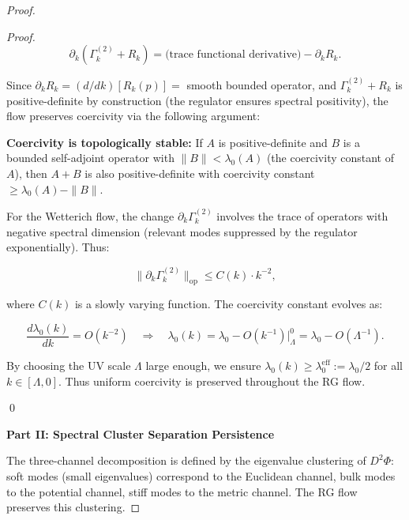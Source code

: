 \begin{proof}
\begin{lemma}
\begin{proof}
\begin{equation}
\partial_k (\Gamma_k^{(2)} + R_k) = \text{(trace functional derivative)} - \partial_k R_k.
\end{equation}

Since $\partial_k R_k = (d/dk)[R_k(p)] = $ smooth bounded operator, and $\Gamma_k^{(2)} + R_k$ is positive-definite by construction (the regulator ensures spectral positivity), the flow preserves coercivity via the following argument:

\textbf{Coercivity is topologically stable:} If $A$ is positive-definite and $B$ is a bounded self-adjoint operator with $\|B\| < \lambda_0(A)$ (the coercivity constant of $A$), then $A + B$ is also positive-definite with coercivity constant $\geq \lambda_0(A) - \|B\|$.

For the Wetterich flow, the change $\partial_k \Gamma_k^{(2)}$ involves the trace of operators with negative spectral dimension (relevant modes suppressed by the regulator exponentially). Thus:

\begin{equation}
\|\partial_k \Gamma_k^{(2)}\|_{\mathrm{op}} \leq C(k) \cdot k^{-2},
\end{equation}

where $C(k)$ is a slowly varying function. The coercivity constant evolves as:

\begin{equation}
\frac{d\lambda_0(k)}{dk} = O(k^{-2}) \quad \Rightarrow \quad \lambda_0(k) = \lambda_0 - O(k^{-1})|_{\Lambda}^0 = \lambda_0 - O(\Lambda^{-1}).
\end{equation}

By choosing the UV scale $\Lambda$ large enough, we ensure $\lambda_0(k) \geq \lambda_0^{\mathrm{eff}} := \lambda_0/2$ for all $k \in [\Lambda, 0]$. Thus uniform coercivity is preserved throughout the RG flow.

\qed

\end{proof}

\end{lemma}

\noindent\textbf{Part II: Spectral Cluster Separation Persistence}

The three-channel decomposition is defined by the eigenvalue clustering of $D^2\Phi$: soft modes (small eigenvalues) correspond to the Euclidean channel, bulk modes to the potential channel, stiff modes to the metric channel. The RG flow preserves this clustering.


\end{proof}
